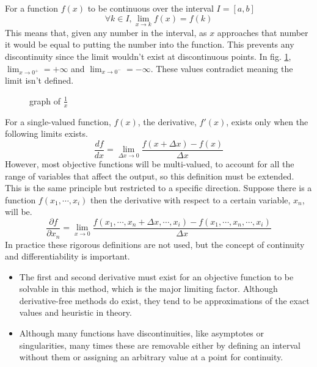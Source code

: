 \documentclass[10pt,a4paper]{report}
\begin{document}
				For a function $f(x)$ to be continuous over the interval $I = [a,b]$
				\begin{equation}
					\forall k \in I, \lim_{x \to k} f(x) = f(k)
					\label{eq:continuity}
				\end{equation}
				This means that, given any number in the interval, as $x$ approaches that number it would be equal to putting
				the number into the function. This prevents any discontinuity since the limit wouldn't exist at discontinuous points. In fig. \ref{fig:discontinuity},
				$\lim_{x \to 0^+} = +\infty$ and $\lim_{x \to 0^-} = -\infty$. These values contradict meaning the limit isn't defined.
				\begin{figure}[h]
					\centering
					\caption{graph of $\frac{1}{x}$}
					\label{fig:discontinuity}
				\end{figure}

				For a single-valued function, $f(x)$, the derivative, $f'(x)$, exists only when the following limits exists.
				\begin{equation}
					\frac{df}{dx} = \lim_{\Delta x \to 0} \frac{f(x+\Delta x) - f(x)}{\Delta x}
					\label{eq:first-principles-uni}
				\end{equation}
				However, most objective functions will be multi-valued, to account for all the range of variables that affect the output, so this
				definition must be extended. This is the same principle but restricted to a specific direction. Suppose
				there is a function $f(x_1,\cdots,x_i)$ then the derivative with respect to a certain variable, $x_n$, will be.
				\begin{equation}
					\frac{\partial f}{\partial x_n} = \lim_{x \to 0} \frac{f(x_1,\cdots,x_n+\Delta x,\cdots,x_i) - f(x_1, \cdots,x_n,\cdots,x_i)}{\Delta x}
					\label{eq:first-principles-multi}
				\end{equation}
				In practice these rigorous definitions are not used, but the concept of continuity and differentiability is important.
				\begin{itemize}
					\item The first and second derivative must exist for an objective function to be solvable in this method,
					which is the major limiting factor. Although derivative-free methods do exist,
					they tend to be approximations of the exact values and heuristic in theory.
					\item Although many functions have discontinuities, like asymptotes or singularities, many times these are
					removable either by defining an interval without them or assigning an arbitrary value at a point for continuity.
				\end{itemize}
\end{document}
